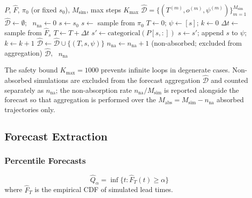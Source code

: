 \begin{algorithm}[htbp]
\caption{Process-Aware Monte Carlo Simulation}
\label{alg:mc-full}
\begin{algorithmic}[1]
\REQUIRE $P$, $\hat{F}$, $\pi_0$ (or fixed $s_0$), $M_{\text{sim}}$,
    max steps $K_{\max}$
\ENSURE $\hat{\mathcal{D}} = \{(T^{(m)}, o^{(m)}, \psi^{(m)})\}_{m=1}^{M_{\text{sim}}}$
\STATE $\hat{\mathcal{D}} \gets \emptyset$; \ $n_{\text{na}} \gets 0$
        \STATE $s \gets s_0$
    \ELSE
        \STATE $s \gets$ sample from $\pi_0$
    \ENDIF
    \STATE $T \gets 0$; $\psi \gets [s]$; $k \gets 0$
        \STATE $\Delta t \gets$ sample from $\hat{F}_s$
        \STATE $T \gets T + \Delta t$
        \STATE $s' \gets \text{categorical}(P[s, :])$
        \STATE $s \gets s'$; append $s$ to $\psi$; $k \gets k + 1$
    \ENDWHILE
        \STATE $\hat{\mathcal{D}} \gets \hat{\mathcal{D}} \cup \{(T, s, \psi)\}$
    \ELSE
        \STATE $n_{\text{na}} \gets n_{\text{na}} + 1$ \quad (non-absorbed; excluded from aggregation)
    \ENDIF
\ENDFOR
\RETURN $\hat{\mathcal{D}}$, \ $n_{\text{na}}$
\end{algorithmic}
\end{algorithm}

The safety bound $K_{\max} = 1000$ prevents infinite loops in degenerate
cases. Non-absorbed simulations are excluded from the forecast aggregation
$\hat{\mathcal{D}}$ and counted separately as $n_{\text{na}}$; the
non-absorption rate $n_{\text{na}}/M_{\text{sim}}$ is reported alongside the
forecast so that aggregation is performed over the $M_{\text{abs}} =
M_{\text{sim}} - n_{\text{na}}$ absorbed trajectories only.


\subsection{Forecast Extraction}
\label{sec:s4-forecasts}

\subsubsection{Percentile Forecasts}

\begin{definition}
\label{def:percentile-forecast}
\begin{equation}
\label{eq:percentile}
\hat{Q}_\alpha = \inf \{t : \hat{F}_T(t) \geq \alpha\}
\end{equation}
where $\hat{F}_T$ is the empirical CDF of simulated lead times.
\end{definition}


